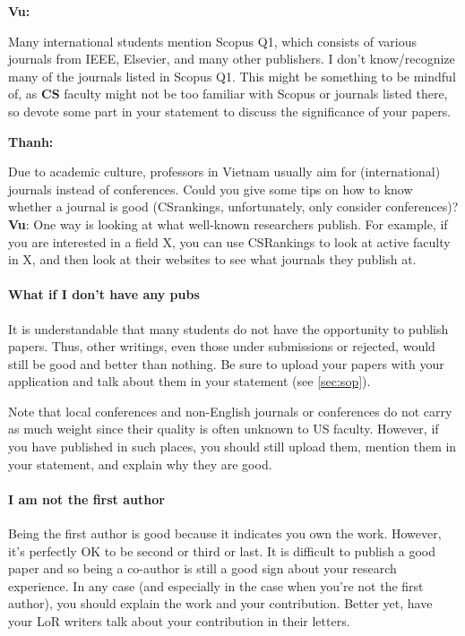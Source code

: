 \documentclass[oneside,11pt,dvipsnames]{book}
\newenvironment{commentbox}[1][]{
  \small
  \begin{mybox}
    {\small \textbf{#1}}
  }{
  \end{mybox}
}
\begin{document}
\begin{commentbox}[Vu:]
  Many international students mention Scopus Q1, which consists of various journals from IEEE, Elsevier, and many other publishers.  I don't know/recognize many of the journals listed in Scopus Q1. This might be something to be mindful of, as \textbf{CS} faculty might not be too familiar with Scopus or journals listed there, so devote some part in your statement to discuss the significance of your papers.
\end{commentbox}

\begin{commentbox}[Thanh:]
    Due to academic culture, professors in Vietnam usually aim for (international) journals instead of conferences. Could you give some tips on how to know whether a journal is good (CSrankings, unfortunately, only consider conferences)?
    \tcblower
    \textbf{Vu}: One way is looking at what well-known researchers publish. For example, if you are interested in a field X, you can use CSRankings to look at active faculty in X, and then look at their websites to see what journals they publish at.
\end{commentbox}
\paragraph{What if I don't have any pubs} It is understandable that many students do not have the opportunity to publish papers. Thus, other writings, even those under submissions or rejected, would still be good and better than nothing.  Be sure to upload your papers with your application and talk about them in your statement (see \autoref{sec:sop}).  

Note that local conferences and non-English journals or conferences do
not carry as much weight since their quality is often unknown to US faculty. However, if you have published in such places, you should still upload them, mention them in your statement, and explain why they are good.


\paragraph{I am not the first author} Being the first author is good because it indicates you own the work. However, it's perfectly OK to be second or third or last.  It is difficult to publish a good paper and so being a co-author is still a good sign about your research experience. In any case (and especially in the case when you're not the first author), you should explain the work and your contribution.  Better yet, have your LoR writers talk about your contribution in their letters.
\end{document}
